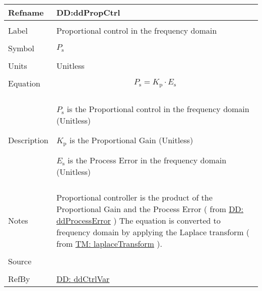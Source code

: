 \documentclass[12pt]{article}
\begin{document}
\vspace{\baselineskip}
\noindent
\begin{minipage}{\textwidth}
\begin{tabular}{>{\raggedright}p{}>{\raggedright\arraybackslash}p{}}
\toprule \textbf{Refname} & \textbf{DD:ddPropCtrl}
\label{DD:ddPropCtrl}
\\ \midrule \\
Label & Proportional control in the frequency domain
        
\\ \midrule \\
Symbol & ${P_{\text{s}}}$
         
\\ \midrule \\
Units & Unitless
        
\\ \midrule \\
Equation & \begin{displaymath}
           {P_{\text{s}}}={K_{\text{p}}}\cdot{}{E_{\text{s}}}
           \end{displaymath}
\\ \midrule \\
Description & \begin{symbDescription}
              \item{${P_{\text{s}}}$ is the Proportional control in the frequency domain (Unitless)}
              \item{${K_{\text{p}}}$ is the Proportional Gain (Unitless)}
              \item{${E_{\text{s}}}$ is the Process Error in the frequency domain (Unitless)}
              \end{symbDescription}
\\ \midrule \\
Notes & Proportional controller is the product of the Proportional Gain and the Process Error ( from  \hyperref[DD:ddProcessError]{DD: ddProcessError} ) The equation is converted to frequency domain by applying the Laplace transform ( from \hyperref[TM:laplaceTransform]{TM: laplaceTransform} ).
        
\\ \midrule \\
Source & \cite{johnson2008}
         
\\ \midrule \\
RefBy & \hyperref[DD:ddCtrlVar]{DD: ddCtrlVar}
        
\\ \bottomrule
\end{tabular}
\end{minipage}
\end{document}
